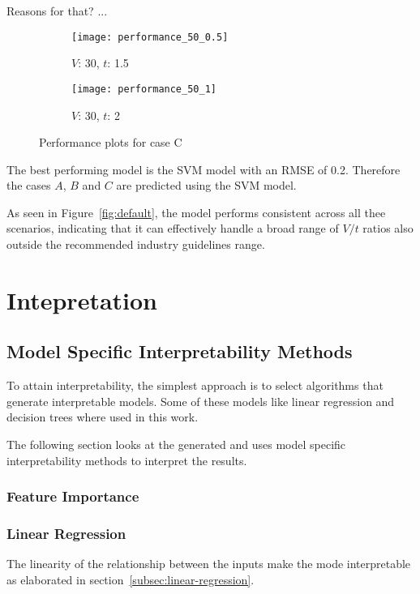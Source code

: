 Reasons for that? ...

\begin{figure}[H]
\begin{tcolorbox}[arc=0pt,boxrule=0.5pt]
\begin{subfigure}{0.5\textwidth}
\texttt{[image: performance\_50\_0.5]}
\caption{$V$: 30, $t$: 1.5}
\label{fig:performance-30_1.5}
\end{subfigure}
\hfill
\begin{subfigure}{0.5\textwidth}
\texttt{[image: performance\_50\_1]}
\caption{$V$: 30, $t$: 2}
\label{fig:performance-30_2.0}
\end{subfigure}
\end{tcolorbox}
\caption{Performance plots for case C}
\label{fig:performance-case-c}
\end{figure}


The best performing model is the \ac{SVM} model with an \ac{RMSE} of 0.2.
Therefore the cases $A$, $B$  and $C$ are predicted using the \ac{SVM} model.

As seen in Figure~\ref{fig:default}, the model performs consistent across all thee
scenarios, indicating that it can effectively handle a broad range of $V/t$ ratios also
outside the recommended industry guidelines range.


\section{Intepretation}
\subsection{Model Specific Interpretability
Methods}\label{subsec:model-specific-interpretability
-methods}

To attain interpretability, the simplest approach is to select algorithms
that generate
interpretable models.
Some of these models like linear regression and decision trees where used in
this work.

The following section looks at the generated and uses model specific
interpretability methods to
interpret the results.

\subsubsection{Feature Importance}

\subsubsection{Linear Regression}\label{subsubsec:linear-regression}
The linearity of the relationship between the inputs make the mode
interpretable as elaborated in section~\ref{subsec:linear-regression}.

